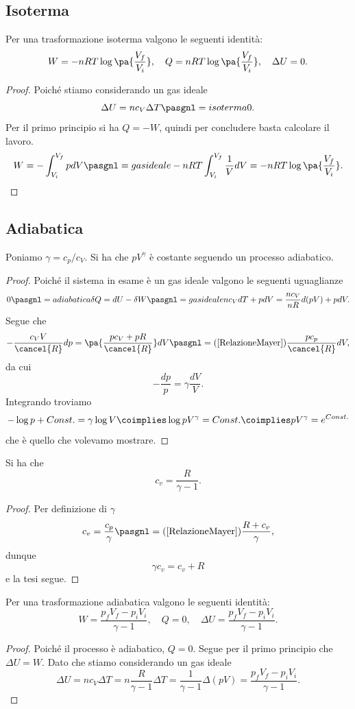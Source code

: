\subsection{Isoterma}
\begin{proposition}\label{EnergieIsoterma}
Per una trasformazione isoterma valgono le seguenti identit\`a:
\[W=-nRT\log\pa{\frac{V_f}{V_i}},\quad
Q=nRT\log\pa{\frac{V_f}{V_i}},\quad
\Delta U=0.\]
\end{proposition}
\begin{proof}
Poich\'e stiamo considerando un gas ideale \[\Delta U=nc_V\Delta T\pasgnl={isoterma}0.\] 
Per il primo principio si ha $Q=-W$, quindi per concludere basta calcolare il lavoro.
\[W=-\int_{V_i}^{V_f}pdV\pasgnl={gas ideale}-nRT\int_{V_i}^{V_f}\frac1VdV=-nRT\log\pa{\frac{V_f}{V_i}}.\]
\end{proof}

\subsection{Adiabatica}
\begin{proposition}\label{EquazioneStatoAdiabatica}
Poniamo $\gamma=c_p/c_V$. Si ha che $pV^\gamma$ \`e costante seguendo un processo adiabatico.
\end{proposition}
\begin{proof}
Poich\'e il sistema in esame \`e un gas ideale valgono le seguenti uguaglianze
\[0\pasgnl={adiabatica}\delta Q=dU-\delta W\pasgnl={gas ideale}nc_VdT+pdV=\frac{nc_V}{nR}d(pV)+p dV.\]
Segue che
\[-\frac{c_VV}{\cancel{R}}dp=\pa{\frac{pc_V+pR}{\cancel{R}}}dV\pasgnl={(\ref{RelazioneMayer})}\frac{pc_p}{\cancel{R}}dV,\]
da cui
\[-\frac{dp}p=\gamma\frac{dV}V.\]
Integrando troviamo
\[-\log p+Const.=\gamma\log V\coimplies \log pV^\gamma=Const.\coimplies pV^\gamma=e^{Const.}\]
che \`e quello che volevamo mostrare.
\end{proof}
\begin{remark}
Si ha che \[c_v=\frac R{\gamma-1}.\]
\end{remark}
\begin{proof}
Per definizione di $\gamma$
\[c_v=\frac{c_p}\gamma\pasgnl={(\ref{RelazioneMayer})}\frac{R+c_v}\gamma,\]
dunque
\[\gamma c_v=c_v+R\]
e la tesi segue.
\end{proof}

\begin{proposition}\label{EnergieAdiabatica}
Per una trasformazione adiabatica valgono le seguenti identit\`a:
\[W=\frac{p_fV_f-p_iV_i}{\gamma-1},\quad
Q=0,\quad
\Delta U=\frac{p_fV_f-p_iV_i}{\gamma-1}.\]
\end{proposition}
\begin{proof}
Poich\'e il processo \`e adiabatico, $Q=0$. Segue per il primo principio che $\Delta U=W$. Dato che stiamo considerando un gas ideale
\[\Delta U=nc_V\Delta T=n\frac R{\gamma-1}\Delta T=\frac 1{\gamma-1}\Delta (pV)=\frac{p_fV_f-p_iV_i}{\gamma-1}.\]
\end{proof}

